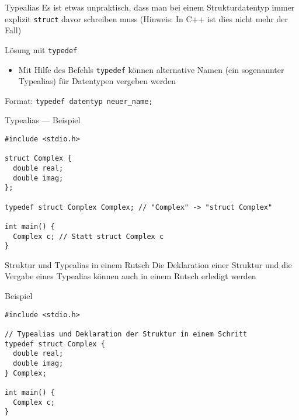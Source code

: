 \documentclass[presentation]{beamer}
\begin{document}
\begin{frame}[label={sec:org1cc46f0},fragile]{Typealias}
 Es ist etwas unpraktisch, dass man bei einem Strukturdatentyp immer
explizit {\color{solarizedYellow}\verb!struct!} davor schreiben muss (Hinweis: In C++ ist dies nicht
mehr der Fall)
\begin{block}{Lösung mit {\color{solarizedYellow}\texttt{typedef}}}
\begin{itemize}
\item Mit Hilfe des Befehls {\color{solarizedYellow}\verb!typedef!} können alternative Namen (ein
sogenannter Typealias) für Datentypen vergeben werden
\end{itemize}
Format: {\color{solarizedYellow}\verb!typedef datentyp neuer_name;!}
\end{block}
\end{frame}
\begin{frame}[label={sec:org7e885a6},fragile]{Typealias --- Beispiel}
 \begin{verbatim}
#include <stdio.h>

struct Complex {
  double real;
  double imag;
};

typedef struct Complex Complex; // "Complex" -> "struct Complex"

int main() {
  Complex c; // Statt struct Complex c
}
\end{verbatim}
\end{frame}
\begin{frame}[label={sec:org66a5ed9},fragile]{Struktur und Typealias in einem Rutsch}
 Die Deklaration einer Struktur und die Vergabe eines Typealias können
auch \alert{in einem Rutsch} erledigt werden
\begin{exampleblock}{Beispiel}
\begin{verbatim}
#include <stdio.h>

// Typealias und Deklaration der Struktur in einem Schritt
typedef struct Complex {
  double real;
  double imag;
} Complex;

int main() {
  Complex c;
}
\end{verbatim}
\end{exampleblock}
\end{frame}
\end{document}
